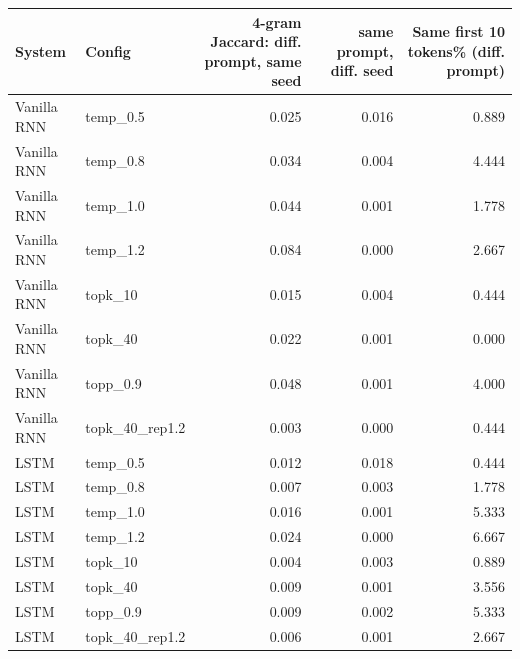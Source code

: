 \begin{tabular}{llrrr}
\toprule
System & Config & 4-gram Jaccard: diff. prompt, same seed & same prompt, diff. seed & Same first 10 tokens\% (diff. prompt) \\
\midrule
Vanilla RNN & temp\_0.5 & 0.025 & 0.016 & 0.889 \\
Vanilla RNN & temp\_0.8 & 0.034 & 0.004 & 4.444 \\
Vanilla RNN & temp\_1.0 & 0.044 & 0.001 & 1.778 \\
Vanilla RNN & temp\_1.2 & 0.084 & 0.000 & 2.667 \\
Vanilla RNN & topk\_10 & 0.015 & 0.004 & 0.444 \\
Vanilla RNN & topk\_40 & 0.022 & 0.001 & 0.000 \\
Vanilla RNN & topp\_0.9 & 0.048 & 0.001 & 4.000 \\
Vanilla RNN & topk\_40\_rep1.2 & 0.003 & 0.000 & 0.444 \\
LSTM & temp\_0.5 & 0.012 & 0.018 & 0.444 \\
LSTM & temp\_0.8 & 0.007 & 0.003 & 1.778 \\
LSTM & temp\_1.0 & 0.016 & 0.001 & 5.333 \\
LSTM & temp\_1.2 & 0.024 & 0.000 & 6.667 \\
LSTM & topk\_10 & 0.004 & 0.003 & 0.889 \\
LSTM & topk\_40 & 0.009 & 0.001 & 3.556 \\
LSTM & topp\_0.9 & 0.009 & 0.002 & 5.333 \\
LSTM & topk\_40\_rep1.2 & 0.006 & 0.001 & 2.667 \\
\bottomrule
\end{tabular}
